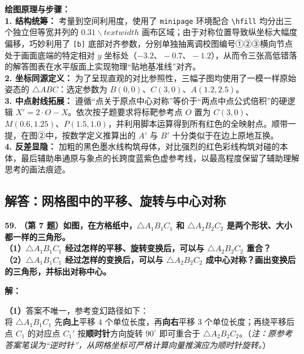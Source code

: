 \vspace{0.4cm}
{\small\color{blue!70!black}
\textbf{绘图原理与步骤：}\\
\textbf{1. 结构统筹：} 考量到空间利用度，使用了 \texttt{minipage} 环境配合 \texttt{\textbackslash{}hfill} 均分出三个独立但等宽并列的 $0.31\backslash{}textwidth$ 画布区域；由于对称位置导致纵坐标大幅度偏移，巧妙利用了 \texttt{[b]} 底部对齐参数，分别单独抽离调校图编号①②③横向节点处于画面底端的特定相对 $y$ 坐标处（$-3.2、-0.7、-1.2$），从而令三张高低错落的解答图表在水平版面上实现物理“贴地基准线”对齐。\\
\textbf{2. 坐标同源定义：} 为了呈现直观的对比参照性，三幅子图均使用了一模一样原始姿态的 $\triangle ABC$：选定参数为 $B(0,0)$、$C(3,0)、A(1.2, 2.5)$。\\
\textbf{3. 中点射线拓展：} 遵循“点关于原点中心对称”等价于“两点中点公式倍积”的硬逻辑 $X'=2 \cdot O-X$。依次按子题要求将标靶参考点 $O$ 置为 $C(3,0)$、$M(0.6, 1.25)、P(1.5, 1.0)$，并利用脚本运算得到所有红色的全映射点。顺带一提，在图②中，按数学定义推算出的 $A'$ 与 $B'$ 十分类似于在边上原地互换。\\
\textbf{4. 反差显隐：} 加粗的黑色墨水线构筑母体，对比强烈的红色彩线构筑对碰的本体，最后辅助串通原与象点的长跨度蓝紫色虚参考线，以最高程度保留了辅助理解思考的画法痕迹。
}

\newpage

\newpage

\subsection{解答：网格图中的平移、旋转与中心对称}

\vspace{0.6cm}

\textbf{\LARGE 59.} \textbf{（第 7 题）如图，在方格纸中，$\triangle A_1B_1C_1$ 和 $\triangle A_2B_2C_2$ 是两个形状、大小都一样的三角形。\\
（1）$\triangle A_1B_1C_1$ 经过怎样的平移、旋转变换后，可以与 $\triangle A_2B_2C_2$ 重合？\\
（2）$\triangle A_1B_1C_1$ 经过怎样的变换后，可以与 $\triangle A_2B_2C_2$ 成中心对称？画出变换后的三角形，并标出对称中心。}

\vspace{0.4cm}
\textbf{解：}

\textbf{（1）}答案不唯一，参考变幻路径如下：\\
将 $\triangle A_1B_1C_1$ 先\textbf{向上}平移 $4$ 个单位长度，再\textbf{向右}平移 $3$ 个单位长度；再绕平移后点 $C_1$ 的对应点 $C_1'$ 按\textbf{顺时针}方向旋转 $90^\circ$ 即可重合于 $\triangle A_2B_2C_2$。（\textit{注：原参考答案笔误为“逆时针”，从网格坐标可严格计算向量推演应为顺时针旋转。}）

